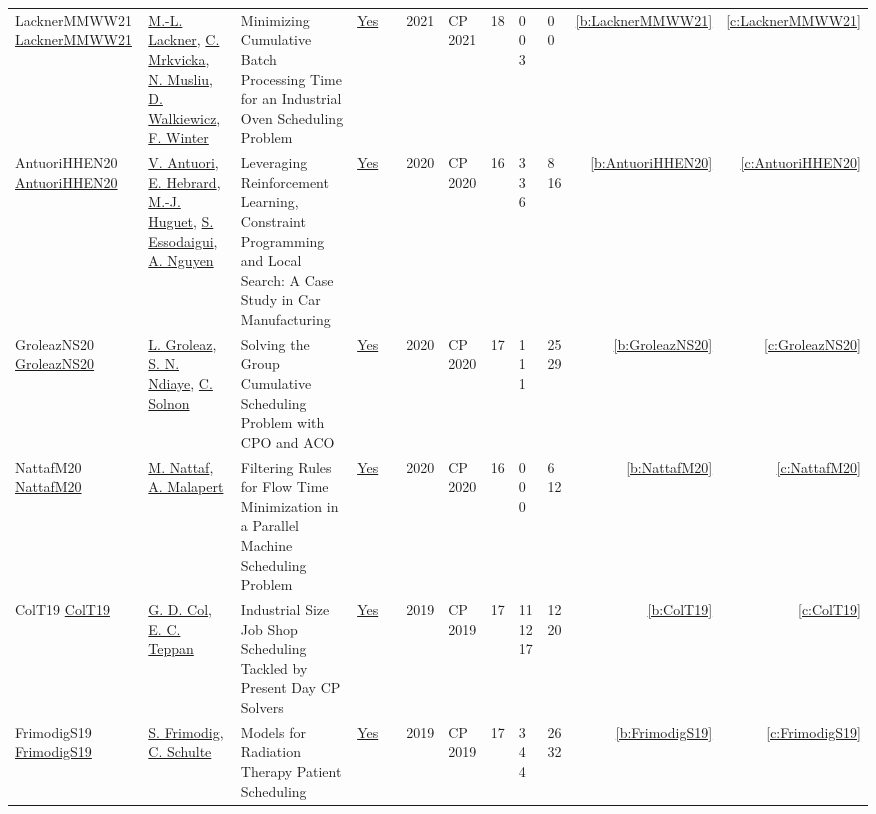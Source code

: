 {\begin{longtable}{>{\raggedright\arraybackslash}p{3cm}>{\raggedright\arraybackslash}p{4.5cm}>{\raggedright\arraybackslash}p{6.0cm}rrrp{2.5cm}rp{1cm}p{1cm}rr}
LacknerMMWW21 \href{https://doi.org/10.4230/LIPIcs.CP.2021.37}{LacknerMMWW21} & \hyperref[auth:a62]{M.-L. Lackner}, \hyperref[auth:a63]{C. Mrkvicka}, \hyperref[auth:a45]{N. Musliu}, \hyperref[auth:a46]{D. Walkiewicz}, \hyperref[auth:a43]{F. Winter} & Minimizing Cumulative Batch Processing Time for an Industrial Oven Scheduling Problem & \href{../works/LacknerMMWW21.pdf}{Yes} & \cite{LacknerMMWW21} & 2021 & CP 2021 & 18 & 0 0 3 & 0 0 & \ref{b:LacknerMMWW21} & \ref{c:LacknerMMWW21}\\
AntuoriHHEN20 \href{https://doi.org/10.1007/978-3-030-58475-7_38}{AntuoriHHEN20} & \hyperref[auth:a53]{V. Antuori}, \hyperref[auth:a1]{E. Hebrard}, \hyperref[auth:a54]{M.-J. Huguet}, \hyperref[auth:a55]{S. Essodaigui}, \hyperref[auth:a56]{A. Nguyen} & \cellcolor{green!10}Leveraging Reinforcement Learning, Constraint Programming and Local Search: {A} Case Study in Car Manufacturing & \href{../works/AntuoriHHEN20.pdf}{Yes} & \cite{AntuoriHHEN20} & 2020 & CP 2020 & 16 & 3 3 6 & 8 16 & \ref{b:AntuoriHHEN20} & \ref{c:AntuoriHHEN20}\\
GroleazNS20 \href{https://doi.org/10.1007/978-3-030-58475-7_36}{GroleazNS20} & \hyperref[auth:a83]{L. Groleaz}, \hyperref[auth:a84]{S. N. Ndiaye}, \hyperref[auth:a85]{C. Solnon} & \cellcolor{green!10}Solving the Group Cumulative Scheduling Problem with {CPO} and {ACO} & \href{../works/GroleazNS20.pdf}{Yes} & \cite{GroleazNS20} & 2020 & CP 2020 & 17 & 1 1 1 & 25 29 & \ref{b:GroleazNS20} & \ref{c:GroleazNS20}\\
NattafM20 \href{https://doi.org/10.1007/978-3-030-58475-7_27}{NattafM20} & \hyperref[auth:a81]{M. Nattaf}, \hyperref[auth:a82]{A. Malapert} & \cellcolor{green!10}Filtering Rules for Flow Time Minimization in a Parallel Machine Scheduling Problem & \href{../works/NattafM20.pdf}{Yes} & \cite{NattafM20} & 2020 & CP 2020 & 16 & 0 0 0 & 6 12 & \ref{b:NattafM20} & \ref{c:NattafM20}\\
ColT19 \href{https://doi.org/10.1007/978-3-030-30048-7_9}{ColT19} & \hyperref[auth:a93]{G. D. Col}, \hyperref[auth:a94]{E. C. Teppan} & Industrial Size Job Shop Scheduling Tackled by Present Day {CP} Solvers & \href{../works/ColT19.pdf}{Yes} & \cite{ColT19} & 2019 & CP 2019 & 17 & 11 12 17 & 12 20 & \ref{b:ColT19} & \ref{c:ColT19}\\
FrimodigS19 \href{https://doi.org/10.1007/978-3-030-30048-7_25}{FrimodigS19} & \hyperref[auth:a95]{S. Frimodig}, \hyperref[auth:a92]{C. Schulte} & Models for Radiation Therapy Patient Scheduling & \href{../works/FrimodigS19.pdf}{Yes} & \cite{FrimodigS19} & 2019 & CP 2019 & 17 & 3 4 4 & 26 32 & \ref{b:FrimodigS19} & \ref{c:FrimodigS19}\\

\end{longtable}}
